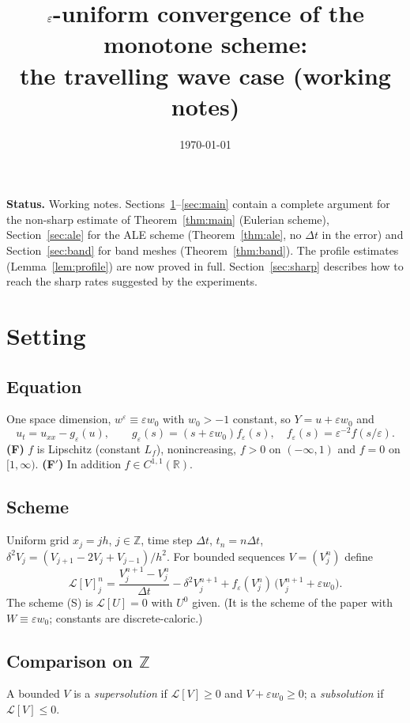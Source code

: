 \documentclass[11pt]{amsart}
\title{$\ve$-uniform convergence of the monotone scheme:\\ the travelling wave case (working notes)}
\date{\today}
\theoremstyle{remark}
\newcommand{\ve}{\varepsilon}
\newcommand{\R}{\mathbb{R}}
\newcommand{\Z}{\mathbb{Z}}
\newcommand{\Lop}{\mathcal{L}}
\begin{document}
\maketitle

\noindent\textbf{Status.} Working notes. Sections~\ref{sec:setting}--\ref{sec:main}
contain a complete argument for the non-sharp estimate of
Theorem~\ref{thm:main} (Eulerian scheme), Section~\ref{sec:ale} for the ALE
scheme (Theorem~\ref{thm:ale}, no $\Delta t$ in the error) and
Section~\ref{sec:band} for band meshes (Theorem~\ref{thm:band}). The profile
estimates (Lemma~\ref{lem:profile}) are now proved in full. Section~\ref{sec:sharp} describes how to
reach the sharp rates suggested by the experiments.

\section{Setting}\label{sec:setting}

\subsection*{Equation} One space dimension, $w^\ve\equiv\ve w_0$ with $w_0>-1$
constant, so $Y=u+\ve w_0$ and
\begin{equation}\label{eq:P}
u_t=u_{xx}-g_\ve(u),\qquad g_\ve(s)=(s+\ve w_0)f_\ve(s),\quad f_\ve(s)=\ve^{-2}f(s/\ve).
\end{equation}
\textbf{(F)} $f$ is Lipschitz (constant $L_f$), nonincreasing, $f>0$ on
$(-\infty,1)$ and $f=0$ on $[1,\infty)$. \textbf{(F$'$)} In addition
$f\in C^{1,1}(\R)$.

\subsection*{Scheme} Uniform grid $x_j=jh$, $j\in\Z$, time step $\Delta t$,
$t_n=n\Delta t$, $\delta^2V_j=(V_{j+1}-2V_j+V_{j-1})/h^2$. For bounded
sequences $V=(V^n_j)$ define
\begin{equation}\label{eq:L}
\Lop[V]^n_j=\frac{V^{n+1}_j-V^n_j}{\Delta t}-\delta^2V^{n+1}_j+f_\ve(V^n_j)\,\big(V^{n+1}_j+\ve w_0\big).
\end{equation}
The scheme (S) is $\Lop[U]=0$ with $U^0$ given. (It is the scheme of the
paper with $W\equiv\ve w_0$; constants are discrete-caloric.)

\subsection*{Comparison on $\Z$} A bounded $V$ is a \emph{supersolution} if
$\Lop[V]\ge0$ and $V+\ve w_0\ge0$; a \emph{subsolution} if $\Lop[V]\le0$.
\end{document}
